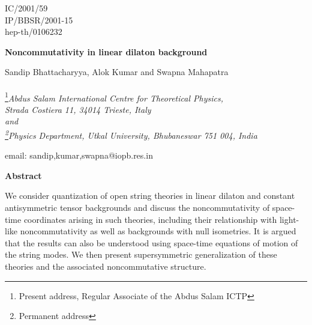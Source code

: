 \documentclass[a4paper,12pt]{article}
\begin{document}
\topmargin 0pt
\oddsidemargin 0mm

\renewcommand{\thefootnote}{\fnsymbol{footnote}}
\begin{titlepage}
\begin{flushright}
IC/2001/59 \\
IP/BBSR/2001-15\\
hep-th/0106232
\end{flushright}

\vspace{5mm}
\begin{center}
{\Large \bf Noncommutativity in linear dilaton background}
\vspace{10mm}

{\large
Sandip Bhattacharyya\myHighlight{$^{**}$}\coordHE{}, Alok Kumar\myHighlight{$^{**}$}\coordHE{} and 
Swapna Mahapatra\myHighlight{$^{*, \dag}$}\coordHE{}\\
\vspace{8mm}
\myHighlight{$^{**}$}\\

\footnote{Present address, Regular Associate of the Abdus 
Salam ICTP}{\em Abdus Salam International Centre for Theoretical
Physics, \\
 Strada Costiera 11, 34014 Trieste, Italy \\
and \\
\footnote{Permanent address}Physics Department, Utkal University, 
Bhubaneswar 751 004, India}\\ 

\vspace{5mm}

email: sandip,kumar,swapna@iopb.res.in}

\end{center}
\vspace{5mm}
\centerline{{\bf{Abstract}}}
\vspace{5mm}


We consider quantization of open string theories in 
linear dilaton and constant antisymmetric tensor
backgrounds and discuss the noncommutativity of space-time 
coordinates arising in such theories, including their 
relationship with light-like noncommutativity as well as 
backgrounds with null isometries. 
It is argued that the results can also be understood using 
space-time equations of motion of the string modes. We then present 
\coordHE{} supersymmetric generalization of 
these theories and the associated noncommutative
structure. 

\end{titlepage}
\end{document}
